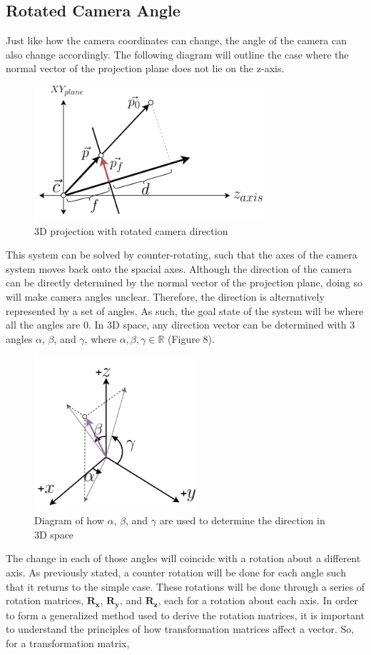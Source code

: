 \documentclass[12pt, letterpaper]{article}
\begin{document}
\subsection{Rotated Camera Angle}
Just like how the camera coordinates can change, the angle of the camera can also change accordingly. The following diagram will outline the case where the normal vector of the projection plane does not lie on the z-axis.
\begin{figure}[H]
\centering
\includegraphics[width=8.5cm]{rotated_3d.png}
\caption{3D projection with rotated camera direction}
\label{fig:figure}
\end{figure} 
\noindent This system can be solved by counter-rotating, such that the axes of the camera system moves back onto the spacial axes. Although the direction of the camera can be directly determined by the normal vector of the projection plane, doing so will make camera angles unclear. Therefore, the direction is alternatively represented by a set of angles. As such, the goal state of the system will be where all the angles are 0. In 3D space, any direction vector can be determined with 3 angles $\alpha$, $\beta$, and $\gamma$, where $\alpha, \beta, \gamma \in \mathbb{R}$ (Figure 8).
\begin{figure}[H]
\centering
\includegraphics[width=6cm]{angles.png}
\caption{Diagram of how $\alpha$, $\beta$, and $\gamma$ are used to determine the direction in 3D space}
\label{fig:figure}
\end{figure} 
\noindent The change in each of those angles will coincide with a rotation about a different axis. As previously stated, a counter rotation will be done for each angle such that it returns to the simple case. These rotations will be done through a series of rotation matrices, $\mathbf{R_x}$, $\mathbf{R_y}$, and $\mathbf{R_z}$, each for a rotation about each axis. In order to form a generalized method used to derive the rotation matrices, it is important to understand the principles of how transformation matrices affect a vector. So, for a transformation matrix,
\end{document}
